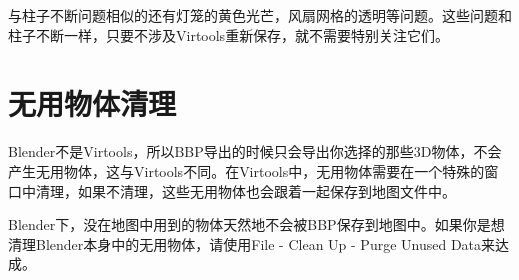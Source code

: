 与柱子不断问题相似的还有灯笼的黄色光芒，风扇网格的透明等问题。这些问题和柱子不断一样，只要不涉及Virtools重新保存，就不需要特别关注它们。

\section{无用物体清理}

Blender不是Virtools，所以BBP导出的时候只会导出你选择的那些3D物体，不会产生无用物体，这与Virtools不同。在Virtools中，无用物体需要在一个特殊的窗口中清理，如果不清理，这些无用物体也会跟着一起保存到地图文件中。

Blender下，没在地图中用到的物体天然地不会被BBP保存到地图中。如果你是想清理Blender本身中的无用物体，请使用File - Clean Up - Purge Unused Data来达成。
